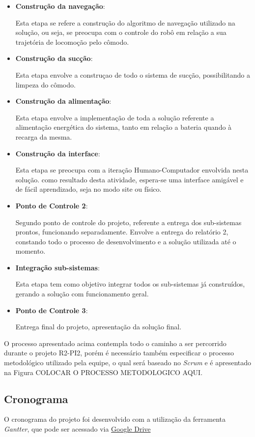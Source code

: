 \begin{itemize}
		\item \textbf{Construção da navegação}:

			Esta etapa se refere a construção do algoritmo de navegação utilizado na solução, ou seja, se preocupa com o controle do robô em relação a sua trajetória de locomoção pelo cômodo.

		\item \textbf{Construção da sucção}:

			Esta etapa envolve a construçao de todo o sistema de sucção, possibilitando a limpeza do cômodo.

		\item \textbf{Construção da alimentação}:

			Esta etapa envolve a implementação de toda a solução referente a alimentação energética do sistema, tanto em relação a bateria quando à recarga da mesma.

		\item \textbf{Construção da interface}:

			Esta etapa se preocupa com a iteração Humano-Computador envolvida nesta solução. como resultado desta atividade, espera-se uma interface amigável e de fácil aprendizado, seja no modo site ou físico.

		\item \textbf{Ponto de Controle 2}:

			Segundo ponto de controle do projeto, referente a entrega dos sub-sistemas prontos, funcionando separadamente. Envolve a entrega do relatório 2, constando todo o processo de desenvolvimento e a solução utilizada até o momento.

		\item \textbf{Integração sub-sistemas}:

			Esta etapa tem como objetivo integrar todos os sub-sistemas já construídos, gerando a solução com funcionamento geral.

		\item \textbf{Ponto de Controle 3}:

			Entrega final do projeto, apresentação da solução final.
	\end{itemize}

	O processo apresentado acima contempla todo o caminho a ser percorrido durante o projeto R2-PI2, porém é necessário também especificar o processo metodológico utilizado pela equipe, o qual será baseado no \textit{Scrum} e é apresentado na Figura COLOCAR O PROCESSO METODOLOGICO AQUI.	

	\subsection{Cronograma} %
	\label{sub:cronograma}
		
		O cronograma do projeto foi desenvolvido com a utilização da ferramenta \textit{Gantter}, que pode ser acessado via \href{https://www.smartapp.com/gantterforgoogledrive/index.html?fileID=0B7s5Po6PeeDMV2RhY2dWVEUtTUU#}{Google Drive}
